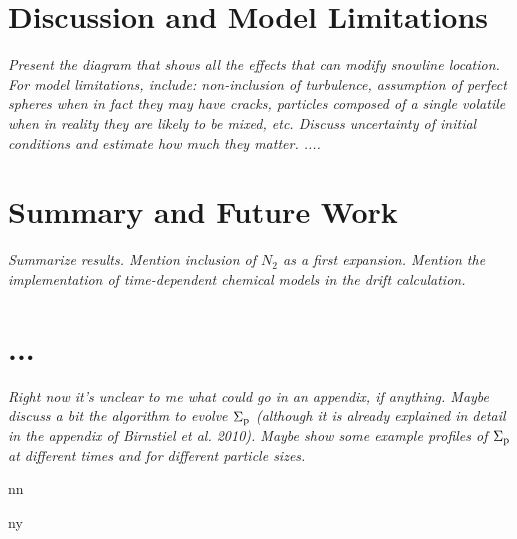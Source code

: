 \documentclass[apj]{emulateapj}
\newcommand\bibinc{n}		%
\newcommand{\emgr}[1]{\emph{ \color{gray} #1}}
\begin{document}

\section{Discussion and Model Limitations}

\emgr{Present the diagram that shows all the effects that can modify snowline location. For model limitations, include: non-inclusion of turbulence, assumption of perfect spheres when in fact they may have cracks, particles composed of a single volatile when in reality they are likely to be mixed, etc. Discuss uncertainty of initial conditions and estimate how much they matter. ....}

\section{Summary and Future Work}

\emgr{Summarize results. Mention inclusion of $N_2$ as a first expansion. Mention the implementation of time-dependent chemical models in the drift calculation.}

\appendix
\section{...}

\emgr{Right now it's unclear to me what could go in an appendix, if anything. Maybe discuss a bit the algorithm to evolve $\Sigma_{\rm p}$ (although it is already explained in detail in the appendix of Birnstiel et al. 2010). Maybe show some example profiles of $\Sigma_{\rm p}$ at different times and for different particle sizes.}

\if\bibinc n

\fi

\if\bibinc y
\begin{thebibliography}
\end{thebibliography}
\fi
\end{document}
